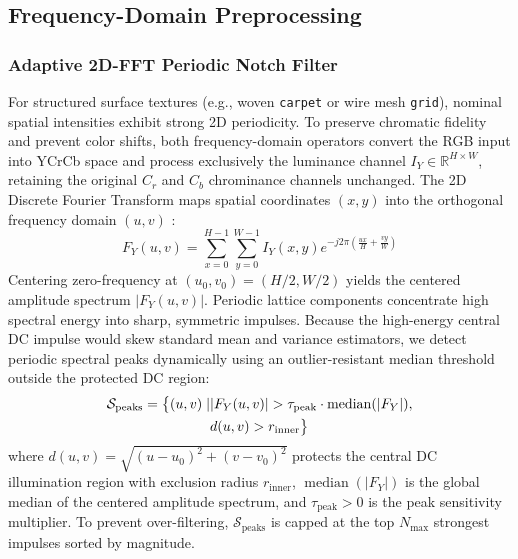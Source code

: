 \subsection{Frequency-Domain Preprocessing}

\subsubsection{Adaptive 2D-FFT Periodic Notch Filter}
For structured surface textures (e.g., woven \texttt{carpet} or wire mesh \texttt{grid}), nominal spatial intensities exhibit strong 2D periodicity. To preserve chromatic fidelity and prevent color shifts, both frequency-domain operators convert the RGB input into YCrCb space and process exclusively the luminance channel $I_Y \in \mathbb{R}^{H \times W}$, retaining the original $C_r$ and $C_b$ chrominance channels unchanged. The 2D Discrete Fourier Transform maps spatial coordinates $(x, y)$ into the orthogonal frequency domain $(u, v)$ \cite{gonzalez2018digital}:
\begin{equation}
F_Y(u, v) = \sum_{x=0}^{H-1} \sum_{y=0}^{W-1} I_Y(x, y) e^{-j 2\pi \left(\frac{ux}{H} + \frac{vy}{W}\right)}
\end{equation}
Centering zero-frequency at $(u_0, v_0) = (H/2, W/2)$ yields the centered amplitude spectrum $|F_Y(u, v)|$. Periodic lattice components concentrate high spectral energy into sharp, symmetric impulses. Because the high-energy central DC impulse would skew standard mean and variance estimators, we detect periodic spectral peaks dynamically using an outlier-resistant median threshold outside the protected DC region:
\begin{align}
\label{eq:fft_peaks}
\mathcal{S}_{\text{peaks}} = \big\{ (u, v) \mid &|F_Y(u, v)| > \tau_{\text{peak}} \cdot \operatorname{median}(|F_Y|), \notag \\
&d(u, v) > r_{\text{inner}} \big\}
\end{align}
where $d(u, v) = \sqrt{(u - u_0)^2 + (v - v_0)^2}$ protects the central DC illumination region with exclusion radius $r_{\text{inner}}$, $\operatorname{median}(|F_Y|)$ is the global median of the centered amplitude spectrum, and $\tau_{\text{peak}} > 0$ is the peak sensitivity multiplier. To prevent over-filtering, $\mathcal{S}_{\text{peaks}}$ is capped at the top $N_{\max}$ strongest impulses sorted by magnitude.


